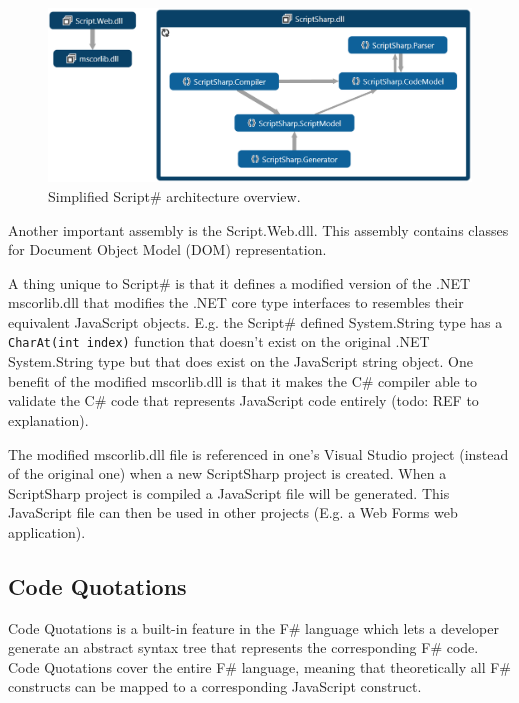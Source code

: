 		\begin{figure}[H]
			\begin{center}
				\centerline{\includegraphics[width=16cm]{resources/images/SimplifiedOverview.png}}
			\end{center}
			\caption{Simplified Script\# architecture overview.}
			\label{simplifiedOverview}
		\end{figure}

		Another important assembly is the Script.Web.dll. This assembly contains classes for Document Object Model (DOM) representation.

		A thing unique to Script\# is that it defines a modified version of the .NET mscorlib.dll that modifies the .NET core type interfaces to resembles their equivalent JavaScript objects. E.g. the Script\# defined System.String type has a \texttt{CharAt(int index)} function that doesn't exist on the original .NET System.String type but that does exist on the JavaScript string object. One benefit of the modified mscorlib.dll is that it makes the C\# compiler able to validate the C\# code that represents JavaScript code entirely (todo: REF to explanation). 

		The modified mscorlib.dll file is referenced in one's Visual Studio project (instead of the original one) when a new ScriptSharp project is created. When a ScriptSharp project is compiled a JavaScript file will be generated. This JavaScript file can then be used in other projects (E.g. a Web Forms web application).




	\subsection{Code Quotations} %
	\label{ssub:code_quotations}
		Code Quotations is a built-in feature in the F\# language which lets a developer generate an abstract syntax tree that represents the corresponding F\# code. Code Quotations cover the entire F\# language, meaning that theoretically all F\# constructs can be mapped to a corresponding JavaScript construct.

